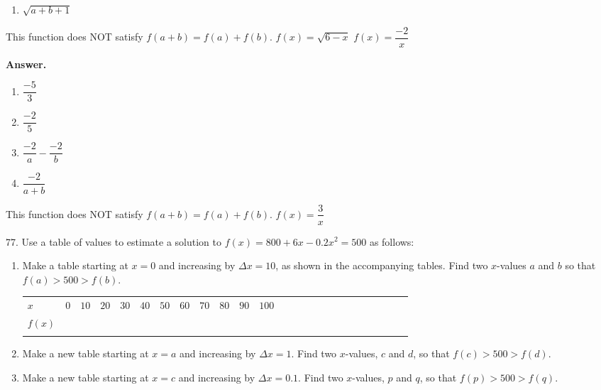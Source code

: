 \documentclass[10pt,]{book}
\theoremstyle{plain}
\theoremstyle{definition}
\theoremstyle{definition}
\theoremstyle{definition}
\newcommand{\hrulethin}  {\noalign{\hrule height 0.04em}}
\newcommand{\hrulethick} {\noalign{\hrule height 0.11em}}
\newcommand{\gt}{>}
\begin{document}
\begin{exerciselist}
\begin{exercisegroup}
\begin{multicols}{2}
\begin{enumerate}[label=\alph*]
\item\hypertarget{li-319}{}\(\sqrt{a+b+1} \)%
\end{enumerate}
\end{multicols}
 This function does NOT satisfy \(f (a + b) = f (a) + f (b)\).%
\exercise[74.]\hypertarget{exercise-84}{}\(f (x) = \sqrt{6-x}\)%
\exercise[75.]\hypertarget{exercise-85}{}\(f (x) =\dfrac{-2}{x} \)%
\par\smallskip
\noindent\textbf{Answer.}\hypertarget{answer-48}{}\quad
\leavevmode%
\begin{multicols}{2}
\begin{enumerate}[label=\alph*]
\item\hypertarget{li-320}{}\(\dfrac{-5}{3} \)%
\item\hypertarget{li-321}{}\(\dfrac{-2}{5} \)%
\item\hypertarget{li-322}{}\(\dfrac{-2}{a}-\dfrac{-2}{b} \)%
\item\hypertarget{li-323}{}\(\dfrac{-2}{a+b} \)%
\end{enumerate}
\end{multicols}
 This function does NOT satisfy \(f (a + b) = f (a) + f (b)\).%
\exercise[76.]\hypertarget{exercise-86}{}\(f (x) = \dfrac{3}{x}\)%
\end{exercisegroup}
\par\smallskip\noindent
\item[77.]\hypertarget{exercise-87}{}Use a table of values to estimate a solution to \(f (x) = 800 + 6x - 0.2x^2 = 500\) as follows: \leavevmode%
\begin{enumerate}[label=\alph*]
\item\hypertarget{li-324}{}Make a table starting at \(x = 0\) and increasing by \(\Delta x = 10\), as shown in the accompanying tables. Find two \(x\)-values \(a\) and \(b\) so that \(f (a)\gt 500\gt f (b)\). \begin{tabular}{AcAcAcAcAcAcAcAcAcAcAcAcA}\hrulethick
\(x\)&\(0\)&\(10\)&\(20\)&\(30\)&\(40\)&\(50\)&\(60\)&\(70\)&\(80\)&\(90\)&\(100\)\tabularnewline\hrulethin
\(f(x)\)&\(\)&\(\)&\(\)&\(\)&\(\)&\(\)&\(\)&\(\)&\(\)&\(\)&\(\)\tabularnewline\hrulethin
\end{tabular}
%
\item\hypertarget{li-325}{}Make a new table starting at \(x = a\) and increasing by \(\Delta x = 1\). Find two \(x\)-values, \(c\) and \(d\), so that \(f (c)\gt 500\gt f (d)\).%
\item\hypertarget{li-326}{}Make a new table starting at \(x = c\) and increasing by \(\Delta x = 0.1\). Find two \(x\)-values, \(p\) and \(q\), so that \(f (p)\gt 500\gt f (q)\).%

\end{enumerate}
\end{exerciselist}
\end{document}
